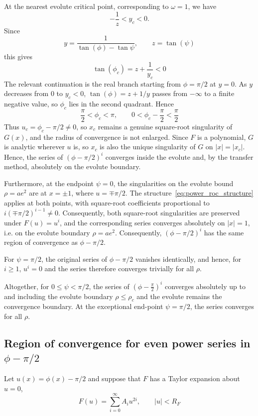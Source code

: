 \documentclass[a4paper]{amsart}
\begin{document}
At the nearest evolute critical point, corresponding to $\omega=1$, we have
\begin{equation*}
-\frac1z<y_c<0.
\end{equation*}
Since
\begin{equation*}
y=\frac{1}{\tan(\phi)-\tan\psi},\qquad z=\tan(\psi)
\end{equation*}
this gives
\begin{equation*}
\tan(\phi_c)=z+\frac1{y_c}<0
\end{equation*}
The relevant continuation is the real branch starting from
$\phi=\pi/2$ at $y=0$. As $y$ decreases from $0$ to $y_c<0$,
$\tan(\phi)=z+1/y$ passes from $-\infty$ to a finite negative value,
so $\phi_c$ lies in the second quadrant. Hence
\begin{equation*}
\frac{\pi}{2}<\phi_c<\pi,\qquad 0<\phi_c-\frac{\pi}{2}<\frac{\pi}{2}
\end{equation*}
Thus $u_c=\phi_c-\pi/2\neq0$, so $x_c$ remains a genuine square-root singularity of $G(x)$, and the radius of convergence is not enlarged. Since $F$ is a polynomial, $G$ is analytic wherever $u$ is, so $x_c$ is also the unique singularity of $G$ on $|x|=|x_c|$. Hence, the series of $(\phi-\pi/2)^i$ converges inside the evolute and, by the transfer method, absolutely on the evolute boundary.

Furthermore, at the endpoint $\psi=0$, the singularities on the evolute bound $\rho=ae^2$ are at $x=\pm1$, where $u=\mp\pi/2$. The structure~\eqref{eq:power_roc_structure} applies at both points, with square-root coefficients proportional to $i(\mp\pi/2)^{i-1}\neq0$. Consequently, both square-root singularities are preserved under $F(u)=u^i$, and the corresponding series converges absolutely on $|x|=1$, i.e. on the evolute boundary $\rho=ae^2$. Consequently, $(\phi-\pi/2)^i$ has the same region of convergence as $\phi-\pi/2$.

For $\psi=\pi/2$, the original series of $\phi-\pi/2$ vanishes identically, and hence, for $i\geq1$, $u^i=0$ and the series therefore converges trivially for all $\rho$.

Altogether, for $0\leq\psi<\pi/2$, the series of $\left(\phi-\frac{\pi}{2}\right)^i$ converges absolutely up to and including the evolute boundary $\rho\leq\rho_c$ and the evolute remains the convergence boundary. At the exceptional end-point $\psi=\pi/2$, the series converges for all $\rho$.


\subsection{Region of convergence for even power series in \texorpdfstring{$\phi-\pi/2$}{φ - π/2}}\label{sec:even_power_series_convergence}
Let $u(x)=\phi(x)-\pi/2$ and suppose that $F$ has a Taylor expansion about $u=0$,
\begin{equation*}
F(u)=\sum_{i=0}^{\infty} A_i u^{2i},
\qquad |u|<R_F
\end{equation*}
\end{document}
